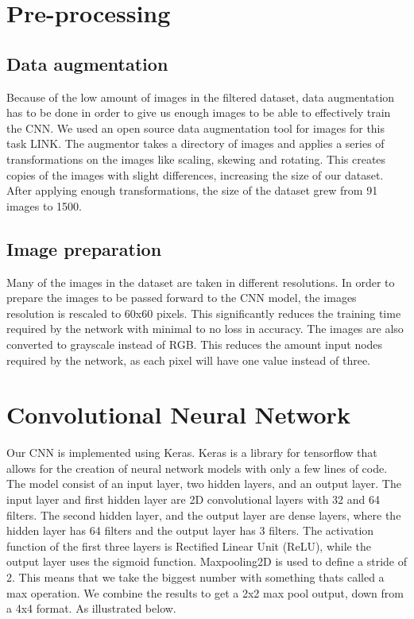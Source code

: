 \section{Pre-processing}\label{pre-processing}

\subsection{Data augmentation}\label{data augmentation}
Because of the low amount of images in the filtered dataset, data augmentation has to be done in order to give us enough images to be able to effectively train the CNN.
We used an open source data augmentation tool for images for this task LINK.
The augmentor takes a directory of images and applies a series of transformations on the images like scaling, skewing and rotating.
This creates copies of the images with slight differences, increasing the size of our dataset.
After applying enough transformations, the size of the dataset grew from 91 images to 1500.

\subsection{Image preparation}\label{imgprep}
Many of the images in the dataset are taken in different resolutions.
In order to prepare the images to be passed forward to the CNN model, the images resolution is rescaled to 60x60 pixels.
This significantly reduces the training time required by the network with minimal to no loss in accuracy.
The images are also converted to grayscale instead of RGB.
This reduces the amount input nodes required by the network, as each pixel will have one value instead of three.

\section{Convolutional Neural Network}\label{sec:cnn}

Our CNN is implemented using Keras.
Keras is a library for tensorflow that allows for the creation of neural network models with only a few lines of code.
The model consist of an input layer, two hidden layers, and an output layer.
The input layer and first hidden layer are 2D convolutional layers with 32 and 64 filters.
The second hidden layer, and the output layer are dense layers, where the hidden layer has 64 filters and the output layer has 3 filters.
The activation function of the first three layers is Rectified Linear Unit (ReLU), while the output layer uses the sigmoid function.
Maxpooling2D is used to define a stride of 2.
This means that we take the biggest number with something thats called a max operation.
We combine the results to get a 2x2 max pool output, down from a 4x4 format.
As illustrated below.

